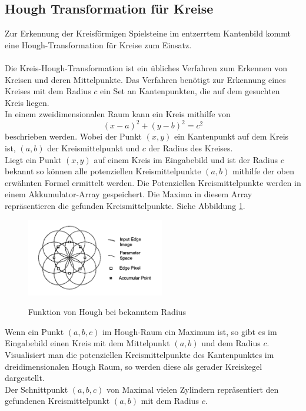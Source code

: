 \documentclass[paper=A4, deutsch]{scrartcl}
\begin{document}
\subsection{Hough Transformation für Kreise}
Zur Erkennung der Kreisförmigen Spielsteine im entzerrtem Kantenbild kommt eine Hough-Transformation für Kreise zum Einsatz. \\
\\
Die Kreis-Hough-Transformation ist ein übliches Verfahren zum Erkennen von Kreisen und deren Mittelpunkte. Das Verfahren benötigt zur Erkennung eines Kreises mit dem Radius \(c\) ein Set an Kantenpunkten, die auf dem gesuchten Kreis liegen. \cite{houghnote2}\\
In einem zweidimensionalen Raum kann ein Kreis mithilfe von \\
\begin{equation}
(x - a)^2 +(y - b)^2 = c^2 
\end{equation} 
beschrieben werden. \cite{houghnote1} Wobei der Punkt \((x,y) \) ein Kantenpunkt auf dem Kreis ist, \((a,b)\) der Kreismittelpunkt und \(c\) der Radius des Kreises.\\

Liegt ein Punkt \((x,y)\) auf einem Kreis im Eingabebild und ist der Radius \(c\) bekannt so k\"onnen alle potenziellen Kreismittelpunkte \((a,b)\) mithilfe der oben erwähnten Formel ermittelt werden. Die Potenziellen Kreismittelpunkte werden in einem Akkumulator-Array gespeichert. Die Maxima in diesem Array repräsentieren die gefunden Kreismittelpunkte.\cite{houghnote2} Siehe Abbildung \ref{fig:hough2d}.\\

\begin{figure}[ht]
	\centering
		\includegraphics[width=6cm]{2dhough_darstellung.png}\\
	\caption[Funktion von Hough bei bekanntem Radius]{Funktion von Hough bei bekanntem Radius\cite{houghnote2}}
	\label{fig:hough2d}
\end{figure}

Wenn ein Punkt \((a,b,c)\) im Hough-Raum ein Maximum ist, so gibt es im Eingabebild einen Kreis mit dem Mittelpunkt \((a,b)\) und dem Radius  \(c\).
Visualisiert man die potenziellen Kreismittelpunkte des Kantenpunktes im dreidimensionalen Hough Raum, so werden diese als gerader Kreiskegel dargestellt.\cite{houghnote1}\\ Der Schnittpunkt \((a,b,c)\) von Maximal vielen Zylindern repräsentiert den gefundenen Kreismittelpunkt \((a,b)\) mit dem Radius \( c\).
\end{document}
